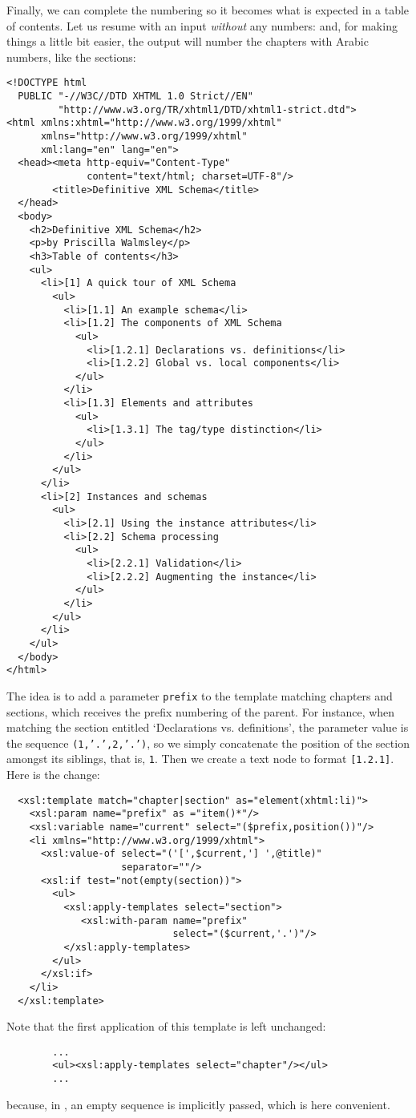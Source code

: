 Finally, we can complete the numbering so it becomes what is expected
in a table of contents. Let us resume with an input \emph{without} any
numbers:
\noindent and, for making things a little bit easier, the output will
number the chapters with Arabic numbers, like the sections:
\begin{verbatim}
<!DOCTYPE html
  PUBLIC "-//W3C//DTD XHTML 1.0 Strict//EN"
         "http://www.w3.org/TR/xhtml1/DTD/xhtml1-strict.dtd">
<html xmlns:xhtml="http://www.w3.org/1999/xhtml"
      xmlns="http://www.w3.org/1999/xhtml"
      xml:lang="en" lang="en">
  <head><meta http-equiv="Content-Type"
              content="text/html; charset=UTF-8"/>
        <title>Definitive XML Schema</title>
  </head>
  <body>
    <h2>Definitive XML Schema</h2>
    <p>by Priscilla Walmsley</p>
    <h3>Table of contents</h3>
    <ul>
      <li>[1] A quick tour of XML Schema
        <ul>
          <li>[1.1] An example schema</li>
          <li>[1.2] The components of XML Schema
            <ul>
              <li>[1.2.1] Declarations vs. definitions</li>
              <li>[1.2.2] Global vs. local components</li>
            </ul>
          </li>
          <li>[1.3] Elements and attributes
            <ul>
              <li>[1.3.1] The tag/type distinction</li>
            </ul>
          </li>
        </ul>
      </li>
      <li>[2] Instances and schemas
        <ul>
          <li>[2.1] Using the instance attributes</li>
          <li>[2.2] Schema processing
            <ul>
              <li>[2.2.1] Validation</li>
              <li>[2.2.2] Augmenting the instance</li>
            </ul>
          </li>
        </ul>
      </li>
    </ul>
  </body>
</html>
\end{verbatim}
The idea is to add a parameter \texttt{prefix} to the template
matching chapters and sections, which receives the prefix numbering of
the parent. For instance, when matching the section entitled
`Declarations vs. definitions', the parameter value is the sequence
\texttt{(1,'.',2,'.')}, so we simply concatenate the position of the
section amongst its siblings, that is, \texttt{1}. Then we create a
text node to format \texttt{[1.2.1]}. Here is the change:
\begin{verbatim}
  <xsl:template match="chapter|section" as="element(xhtml:li)">
    <xsl:param name="prefix" as ="item()*"/>
    <xsl:variable name="current" select="($prefix,position())"/>
    <li xmlns="http://www.w3.org/1999/xhtml">
      <xsl:value-of select="('[',$current,'] ',@title)"
                    separator=""/>
      <xsl:if test="not(empty(section))">
        <ul>
          <xsl:apply-templates select="section">
             <xsl:with-param name="prefix"
                             select="($current,'.')"/>
          </xsl:apply-templates>
        </ul>
      </xsl:if>
    </li>
  </xsl:template>
\end{verbatim}
Note that the first application of this template is left unchanged:
\begin{verbatim}
        ...
        <ul><xsl:apply-templates select="chapter"/></ul>
        ...
\end{verbatim}
because, in \XSLT, an empty sequence is implicitly passed, which is
here convenient.


